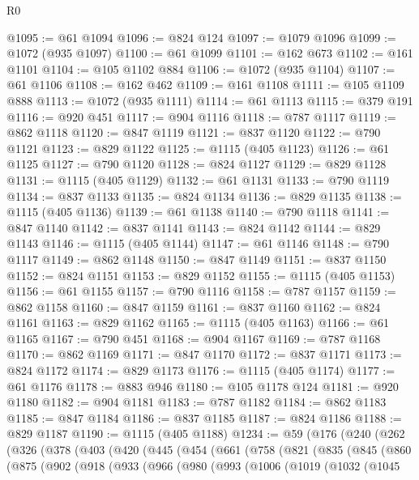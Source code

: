 \begin{lexlean}{R0}
\begin{coremodule}
@1095 := @61 @1094
@1096 := @824 @124
@1097 := @1079 @1096
@1099 := @1072 (@935 @1097)
@1100 := @61 @1099
@1101 := @162 @673
@1102 := @161 @1101
@1104 := @105 @1102 @884
@1106 := @1072 (@935 @1104)
@1107 := @61 @1106
@1108 := @162 @462
@1109 := @161 @1108
@1111 := @105 @1109 @888
@1113 := @1072 (@935 @1111)
@1114 := @61 @1113
@1115 := @379 @191
@1116 := @920 @451
@1117 := @904 @1116
@1118 := @787 @1117
@1119 := @862 @1118
@1120 := @847 @1119
@1121 := @837 @1120
@1122 := @790 @1121
@1123 := @829 @1122
@1125 := @1115 (@405 @1123)
@1126 := @61 @1125
@1127 := @790 @1120
@1128 := @824 @1127
@1129 := @829 @1128
@1131 := @1115 (@405 @1129)
@1132 := @61 @1131
@1133 := @790 @1119
@1134 := @837 @1133
@1135 := @824 @1134
@1136 := @829 @1135
@1138 := @1115 (@405 @1136)
@1139 := @61 @1138
@1140 := @790 @1118
@1141 := @847 @1140
@1142 := @837 @1141
@1143 := @824 @1142
@1144 := @829 @1143
@1146 := @1115 (@405 @1144)
@1147 := @61 @1146
@1148 := @790 @1117
@1149 := @862 @1148
@1150 := @847 @1149
@1151 := @837 @1150
@1152 := @824 @1151
@1153 := @829 @1152
@1155 := @1115 (@405 @1153)
@1156 := @61 @1155
@1157 := @790 @1116
@1158 := @787 @1157
@1159 := @862 @1158
@1160 := @847 @1159
@1161 := @837 @1160
@1162 := @824 @1161
@1163 := @829 @1162
@1165 := @1115 (@405 @1163)
@1166 := @61 @1165
@1167 := @790 @451
@1168 := @904 @1167
@1169 := @787 @1168
@1170 := @862 @1169
@1171 := @847 @1170
@1172 := @837 @1171
@1173 := @824 @1172
@1174 := @829 @1173
@1176 := @1115 (@405 @1174)
@1177 := @61 @1176
@1178 := @883 @946
@1180 := @105 @1178 @124
@1181 := @920 @1180
@1182 := @904 @1181
@1183 := @787 @1182
@1184 := @862 @1183
@1185 := @847 @1184
@1186 := @837 @1185
@1187 := @824 @1186
@1188 := @829 @1187
@1190 := @1115 (@405 @1188)
@1234 := @59
    (@176
      (@240
        (@262
          (@326
            (@378
              (@403
                (@420
                  (@445
                    (@454
                      (@661
                        (@758
                          (@821
                            (@835
                              (@845
                                (@860
                                  (@875
                                    (@902
                                      (@918
                                        (@933
                                          (@966
                                            (@980
                                              (@993
                                                (@1006
                                                  (@1019
                                                    (@1032
                                                      (@1045

\end{coremodule}
\end{lexlean}
